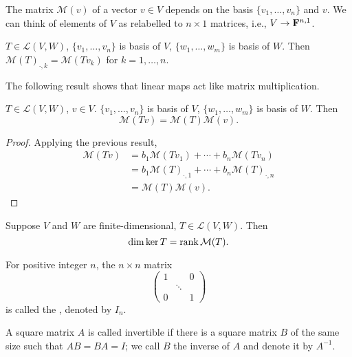 \begin{remark}
The matrix $\mathcal{M}(v)$ of a vector $v\in V$ depends on the basis $\{v_1,\dots,v_n\}$ and $v$. We can think of elements of $V$ as relabelled to $n\times1$ matrices, i.e., $V\to\mathbf F^{n,1}$.
\end{remark}

\begin{lemma}
$T\in\mathcal{L}(V,W)$, $\{v_1,\dots,v_n\}$ is basis of $V$, $\{w_1,\dots,w_m\}$ is basis of $W$. Then $\mathcal{M}(T)_{\cdot,k}=\mathcal{M}(Tv_k)$ for $k=1,\dots,n$.
\end{lemma}

The following result shows that linear maps act like matrix multiplication.

\begin{proposition}
$T\in\mathcal{L}(V,W)$, $v\in V$. $\{v_1,\dots,v_n\}$ is basis of $V$, $\{w_1,\dots,w_m\}$ is basis of $W$. Then
\[\mathcal{M}(Tv)=\mathcal{M}(T)\mathcal{M}(v).\]
\end{proposition}

\begin{proof}
Applying the previous result,
\begin{align*}
\mathcal{M}(Tv)&=b_1\mathcal{M}(Tv_1)+\cdots+b_n\mathcal{M}(Tv_n)\\
&=b_1\mathcal{M}(T)_{\cdot,1}+\cdots+b_n\mathcal{M}(T)_{\cdot,n}\\
&=\mathcal{M}(T)\mathcal{M}(v).
\end{align*}
\end{proof}

\begin{proposition}
Suppose $V$ and $W$ are finite-dimensional, $T\in\mathcal{L}(V,W)$. Then
\[\dim\ker T=\rank \mathcal{M}(T).\]
\end{proposition}

\begin{definition}
For positive integer $n$, the $n\times n$ matrix
\[\begin{pmatrix}
1&&0\\
&\ddots&\\
0&&1
\end{pmatrix}\]
is called the , denoted by $I_n$.
\end{definition}

\begin{definition}[Invertibility]
A square matrix $A$ is called invertible if there is a square matrix $B$ of the same size such that $AB=BA=I$; we call $B$ the inverse of $A$ and denote it by $A^{-1}$.
\end{definition}


